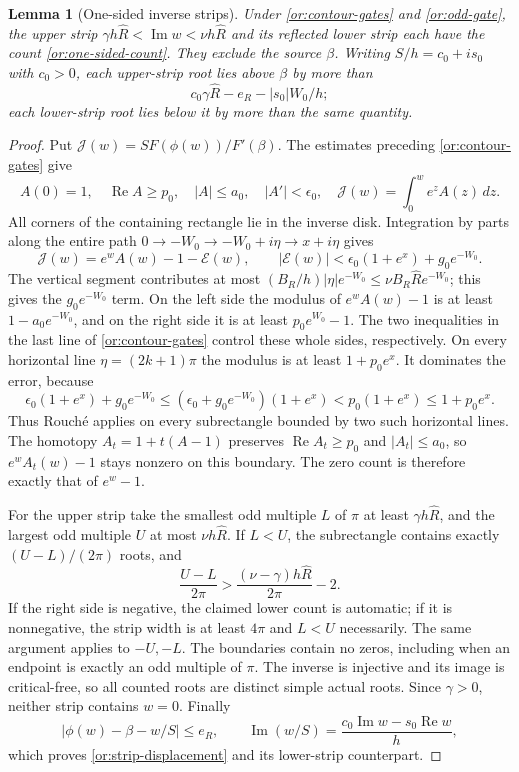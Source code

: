 \documentclass[11pt,reqno]{amsart}
\numberwithin{equation}{section}
\newtheorem{lemma}[theorem]{Lemma}
\theoremstyle{definition}
\theoremstyle{remark}
\renewcommand{\Re}{\operatorname{Re}}
\renewcommand{\Im}{\operatorname{Im}}
\begin{document}
\begin{lemma}[One-sided inverse strips]\label{or:one-sided}
Under \eqref{or:contour-gates} and \eqref{or:odd-gate}, the upper
strip $\gamma h\widehat R<\Im w<\nu h\widehat R$ and its reflected
lower strip each have the count \eqref{or:one-sided-count}.
They exclude the source $\beta$.  Writing
$S/h=c_0+is_0$ with $c_0>0$, each upper-strip root lies above
$\beta$ by more than
\begin{equation}\label{or:strip-displacement}
                c_0\gamma\widehat R-e_R-|s_0|W_0/h;
\end{equation}
each lower-strip root lies below it by more than the same quantity.
\end{lemma}
\begin{proof}
Put $\mathcal J(w)=SF(\phi(w))/F'(\beta)$.
The estimates preceding \eqref{or:contour-gates} give
\[
 A(0)=1,\quad \Re A\ge p_0,\quad |A|\le a_0,\quad
 |A'|<\epsilon_0,\quad
 \mathcal J(w)=\int_0^w e^zA(z)\,dz.
\]
All corners of the containing rectangle lie in the inverse disk.
Integration by parts along the entire path
$0\longrightarrow-W_0\longrightarrow-W_0+i\eta
 \longrightarrow x+i\eta$ gives
\[
 \mathcal J(w)=e^wA(w)-1-\mathcal E(w),\qquad
 |\mathcal E(w)|<\epsilon_0(1+e^x)+g_0e^{-W_0}.
\]
The vertical segment contributes at most
$(B_R/h)|\eta|e^{-W_0}\le\nu B_R\widehat R e^{-W_0}$;
this gives the $g_0e^{-W_0}$ term.
On the left side the modulus of $e^wA(w)-1$ is at least
$1-a_0e^{-W_0}$, and on the right side it is at least
$p_0e^{W_0}-1$.  The two inequalities in the last line of
\eqref{or:contour-gates} control these whole sides, respectively.
On every horizontal line $\eta=(2k+1)\pi$ the modulus is at least
$1+p_0e^x$.  It dominates the error, because
\[
 \epsilon_0(1+e^x)+g_0e^{-W_0}
 \le(\epsilon_0+g_0e^{-W_0})(1+e^x)
 <p_0(1+e^x)\le1+p_0e^x.
\]
Thus Rouch\'e applies on every subrectangle bounded by two such
horizontal lines.  The homotopy
$A_t=1+t(A-1)$ preserves $\Re A_t\ge p_0$ and $|A_t|\le a_0$,
so $e^wA_t(w)-1$ stays nonzero on this boundary.
The zero count is therefore exactly that of $e^w-1$.

For the upper strip take the smallest odd multiple $L$ of $\pi$
at least $\gamma h\widehat R$, and the largest odd multiple $U$
at most $\nu h\widehat R$.  If $L<U$, the subrectangle contains
exactly $(U-L)/(2\pi)$ roots, and
\[
 \frac{U-L}{2\pi}>
            \frac{(\nu-\gamma)h\widehat R}{2\pi}-2.
\]
If the right side is negative, the claimed lower count is automatic;
if it is nonnegative, the strip width is at least $4\pi$ and
$L<U$ necessarily.  The same argument applies to $-U,-L$.
The boundaries contain no zeros, including when an endpoint is exactly
an odd multiple of $\pi$.  The inverse is injective and its image
is critical-free, so all counted roots are distinct simple actual
roots.  Since $\gamma>0$, neither strip contains $w=0$.
Finally
\[
             |\phi(w)-\beta-w/S|\le e_R,
 \qquad \Im(w/S)=\frac{c_0\Im w-s_0\Re w}{h},
\]
which proves \eqref{or:strip-displacement} and its lower-strip
counterpart.
\end{proof}
\end{document}
